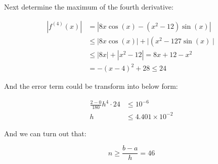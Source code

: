 \begin{solution}
Next determine the maximum of the fourth derivative:


\begin{equation*}
\begin{aligned}
\left|f^{(4)}(x)\right| &=\left|8 x \cos (x)-\left(x^{2}-12\right) \sin (x)\right| \\
& \leq|8 x \cos (x)|+\mid\left(x^{2}-127 \sin (x) \mid\right.\\
& \leq|8 x|+\left|x^{2}-12\right|=8 x+12-x^{2} \\
&=-(x-4)^{2}+28 \leq 24
\end{aligned}
\end{equation*}


And the error term could be transform into below form:


\begin{equation}
\begin{aligned}
	\frac{2-0}{180} h^{4} \cdot 24 &\leq 10^{-6}\\
	h & \leq 4.401 \times 10^{-2}
\end{aligned}
\end{equation}

And we can turn out that:


\begin{equation}
n \geq \frac{b-a}{h}=4 6
\end{equation}



















\end{solution}



















